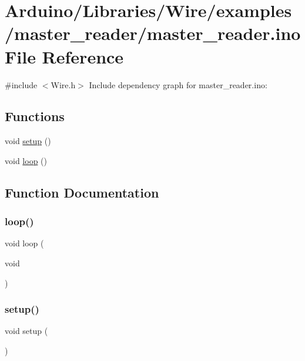 \hypertarget{master__reader_8ino}{}\section{Arduino/\+Libraries/\+Wire/examples/master\+\_\+reader/master\+\_\+reader.ino File Reference}
\label{master__reader_8ino}
{\ttfamily \#include $<$Wire.\+h$>$}\newline
Include dependency graph for master\+\_\+reader.\+ino\+:
\subsection*{Functions}
\begin{DoxyCompactItemize}
\item 
void \hyperlink{master__reader_8ino_a4fc01d736fe50cf5b977f755b675f11d}{setup} ()
\item 
void \hyperlink{master__reader_8ino_afe461d27b9c48d5921c00d521181f12f}{loop} ()
\end{DoxyCompactItemize}


\subsection{Function Documentation}
\mbox{\label{master__reader_8ino_afe461d27b9c48d5921c00d521181f12f}} 
\subsubsection{\texorpdfstring{loop()}{loop()}}
{\footnotesize\ttfamily void loop (\begin{DoxyParamCaption}\item[{void}]{ }\end{DoxyParamCaption})}

\mbox{\label{master__reader_8ino_a4fc01d736fe50cf5b977f755b675f11d}} 
\subsubsection{\texorpdfstring{setup()}{setup()}}
{\footnotesize\ttfamily void setup (\begin{DoxyParamCaption}{ }\end{DoxyParamCaption})}

